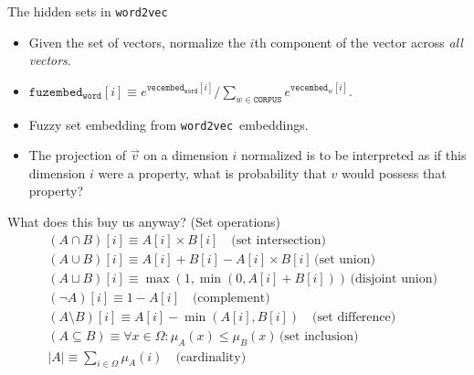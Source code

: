\documentclass[8pt]{beamer}
\newcommand{\fuzembed}{\texttt{fuzembed}}
\newcommand{\vecembed}{\texttt{vecembed}}
\newcommand{\CORPUS}{\texttt{CORPUS}}
\newcommand{\word}{\texttt{word}}
\begin{document}
\begin{frame}{The hidden sets in \texttt{word2vec}}
\begin{itemize}
  \item Given the set of vectors, normalize the $i$th component of the vector across \emph{all vectors}. \pause
  \item $\fuzembed_{\word}[i] \equiv e^{\vecembed_{\word}[i]} / \sum_{w \in \CORPUS} e^{\vecembed_w[i]}$. \pause
  \item Fuzzy set embedding from \texttt{word2vec}~embeddings. \pause
  \item The projection of $\vec v$ on a dimension $i$ normalized  is to be interpreted as
  if this dimension $i$ were a property, what is probability that $v$ would possess that property?
\end{itemize}
\end{frame}

\begin{frame}{What does this buy us anyway? (Set operations)}
\begin{align*} &(A \cap B)[i] \equiv  A[i] \times B[i] \quad \text{(set intersection)} \\
&(A \cup B)[i] \equiv  A[i] + B[i]  - A[i] \times
B[i] \, \text{(set union)}\\ &(A \sqcup B)[i] \equiv  \max(1, \min(0, A[i] +
B[i])) \, \text{(disjoint union)}\\ &(\lnot A)[i] \equiv 1 - A[i] \quad
\text{(complement)}\\ &(A \setminus B)[i] \equiv A[i]  - \min(A[i], B[i]) \quad
\text{(set difference)} \\ &(A \subseteq B) \equiv \forall x \in \Omega:
\mu_A(x) \leq \mu_B(x) \, \text{(set inclusion)}\\ &|A| \equiv \sum_{i \in \Omega} \mu_A (i) \quad \text{(cardinality)} \\
\end{align*}
\end{frame}
\end{document}
